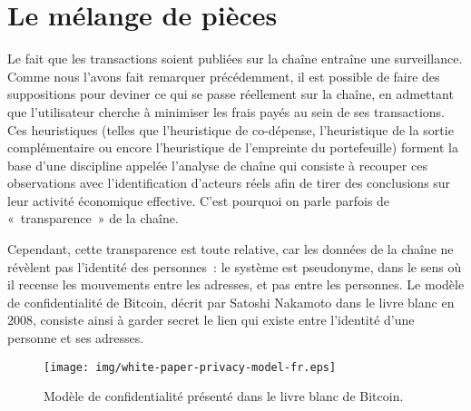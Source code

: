 \section*{Le mélange de pièces}

Le fait que les transactions soient publiées sur la chaîne entraîne une surveillance. Comme nous l'avons fait remarquer précédemment, il est possible de faire des suppositions pour deviner ce qui se passe réellement sur la chaîne, en admettant que l'utilisateur cherche à minimiser les frais payés au sein de ses transactions. Ces heuristiques (telles que l'heuristique de co-dépense, l'heuristique de la sortie complémentaire ou encore l'heuristique de l'empreinte du portefeuille) forment la base d'une discipline appelée l'analyse de chaîne qui consiste à recouper ces observations avec l'identification d'acteurs réels afin de tirer des conclusions sur leur activité économique effective. C'est pourquoi on parle parfois de «~transparence~» de la chaîne. %

Cependant, cette transparence est toute relative, car les données de la chaîne ne révèlent pas l'identité des personnes~: le système est pseudonyme, dans le sens où il recense les mouvements entre les adresses, et pas entre les personnes. Le modèle de confidentialité de Bitcoin, décrit par Satoshi Nakamoto dans le livre blanc en 2008, consiste ainsi à garder secret le lien qui existe entre l'identité d'une personne et ses adresses.

\begin{figure}[h]
  \centering
  \texttt{[image: img/white-paper-privacy-model-fr.eps]}
  \caption{Modèle de confidentialité présenté dans le livre blanc de Bitcoin.}
\end{figure}


